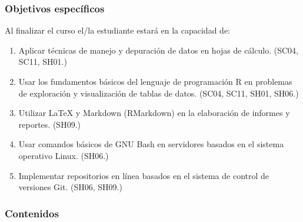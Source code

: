 \begin{refsection}
\subsubsection*{Objetivos específicos}

Al finalizar el curso el/la estudiante estará en la capacidad de:

\begin{enumerate}
\item Aplicar técnicas de manejo y depuración de datos en hojas de cálculo. (SC04, SC11, SH01.)
\item Usar los fundamentos básicos del lenguaje de programación R en problemas de exploración y visualización de tablas de datos. (SC04, SC11, SH01, SH06.)
\item Utilizar \LaTeX{} y Markdown (RMarkdown) en la elaboración de informes y reportes. (SH09.)
\item Usar comandos básicos de GNU Bash en servidores basados en el sistema operativo Linux. (SH06.)
\item Implementar repositorios en línea basados en el sistema de control de versiones Git. (SH06, SH09.)
\end{enumerate}

\subsubsection*{Contenidos}


\end{refsection}
